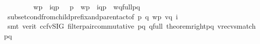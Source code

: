 \begin{isabellebody}
\ \ \ \ \isanewline
\ \ \isamarkupfalse%
\ {\isachardoublequoteopen}{\isacharparenleft}{\kern0pt}{\isacharquery}{\kern0pt}wp\ {\isasymsqdot}\ {\isacharbrackleft}{\kern0pt}{\isacharquery}{\kern0pt}{\isasymlangle}{\isacharparenleft}{\kern0pt}i\isactrlbsup q{\isasymrightarrow}p\isactrlesup {\isacharparenright}{\kern0pt}{\isasymrangle}{\isacharbrackright}{\kern0pt}{\isacharparenright}{\kern0pt}\ {\isasymin}\ {\isasymL}\isactrlsup {\isacharasterisk}{\kern0pt}\ p\ {\isasymand}\ {\isacharparenleft}{\kern0pt}{\isacharparenleft}{\kern0pt}{\isacharparenleft}{\kern0pt}{\isacharquery}{\kern0pt}wp\ {\isasymsqdot}\ {\isacharbrackleft}{\kern0pt}{\isacharquery}{\kern0pt}{\isasymlangle}{\isacharparenleft}{\kern0pt}i\isactrlbsup q{\isasymrightarrow}p\isactrlesup {\isacharparenright}{\kern0pt}{\isasymrangle}{\isacharbrackright}{\kern0pt}{\isacharparenright}{\kern0pt}{\isasymdown}\isactrlsub {\isacharquery}{\kern0pt}{\isacharparenright}{\kern0pt}{\isasymdown}\isactrlsub {\isacharbang}{\kern0pt}\isactrlsub {\isacharquery}{\kern0pt}{\isacharparenright}{\kern0pt}\ {\isacharequal}{\kern0pt}\ {\isacharparenleft}{\kern0pt}{\isacharparenleft}{\kern0pt}{\isacharparenleft}{\kern0pt}{\isacharparenleft}{\kern0pt}{\isacharquery}{\kern0pt}wq{\isacharunderscore}{\kern0pt}full{\isacharparenright}{\kern0pt}{\isasymdown}\isactrlsub {\isacharbang}{\kern0pt}{\isacharparenright}{\kern0pt}{\isasymdown}\isactrlsub {\isacharbraceleft}{\kern0pt}\isactrlsub p\isactrlsub {\isacharcomma}{\kern0pt}\isactrlsub q\isactrlsub {\isacharbraceright}{\kern0pt}{\isacharparenright}{\kern0pt}{\isasymdown}\isactrlsub {\isacharbang}{\kern0pt}\isactrlsub {\isacharquery}{\kern0pt}{\isacharparenright}{\kern0pt}{\isachardoublequoteclose}\isanewline
\ \ \ \ \isamarkupfalse%
\ subset{\isacharunderscore}{\kern0pt}cond{\isacharunderscore}{\kern0pt}from{\isacharunderscore}{\kern0pt}child{\isacharunderscore}{\kern0pt}prefix{\isacharunderscore}{\kern0pt}and{\isacharunderscore}{\kern0pt}parent{\isacharunderscore}{\kern0pt}act{\isacharbrackleft}{\kern0pt}of\ p\ q\ {\isachardoublequoteopen}{\isacharquery}{\kern0pt}wp{\isachardoublequoteclose}\ {\isachardoublequoteopen}{\isacharparenleft}{\kern0pt}{\isacharquery}{\kern0pt}v{\isacharprime}{\kern0pt}{\isasymdown}\isactrlsub q{\isacharparenright}{\kern0pt}{\isachardoublequoteclose}\ i{\isacharbrackright}{\kern0pt}\ \isamarkupfalse%
\ {\isacharparenleft}{\kern0pt}smt\ {\isacharparenleft}{\kern0pt}verit{\isacharcomma}{\kern0pt}\ ccfv{\isacharunderscore}{\kern0pt}SIG{\isacharparenright}{\kern0pt}\ filter{\isacharunderscore}{\kern0pt}pair{\isacharunderscore}{\kern0pt}commutative\ pq\ q{\isacharunderscore}{\kern0pt}full\ theorem{\isacharunderscore}{\kern0pt}right{\isacharunderscore}{\kern0pt}pq\ v{\isacharprime}{\kern0pt}{\isacharunderscore}{\kern0pt}recvs{\isacharunderscore}{\kern0pt}match{\isacharunderscore}{\kern0pt}pq{}\isanewline

\end{isabellebody}
